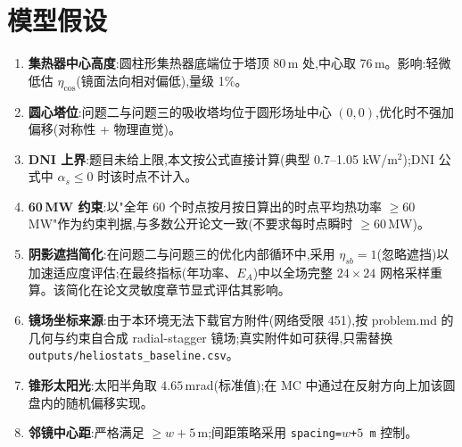 \documentclass[UTF8,a4paper,12pt]{ctexart}
\begin{document}
\section{模型假设}
\begin{enumerate}[label=\textbf{H\arabic*:}, leftmargin=2em]
  \item \textbf{集热器中心高度}:圆柱形集热器底端位于塔顶 80\,m 处,中心取 76\,m。影响:轻微低估 $\eta_{\cos}$(镜面法向相对偏低),量级 1\%。
  \item \textbf{圆心塔位}:问题二与问题三的吸收塔均位于圆形场址中心 $(0,0)$,优化时不强加偏移(对称性 + 物理直觉)。
  \item \textbf{DNI 上界}:题目未给上限,本文按公式直接计算(典型 0.7--1.05 kW/m$^2$);DNI 公式中 $\alpha_s\le 0$ 时该时点不计入。
  \item \textbf{60\,MW 约束}:以"全年 60 个时点按月按日算出的时点平均热功率 $\ge 60$\,MW"作为约束判据,与多数公开论文一致(不要求每时点瞬时 $\ge 60$\,MW)。
  \item \textbf{阴影遮挡简化}:在问题二与问题三的优化内部循环中,采用 $\eta_{sb}=1$(忽略遮挡)以加速适应度评估;在最终指标(年功率、$E_A$)中以全场完整 $24\times 24$ 网格采样重算。该简化在论文灵敏度章节显式评估其影响。
  \item \textbf{镜场坐标来源}:由于本环境无法下载官方附件(网络受限 451),按 problem.md 的几何与约束自合成 radial-stagger 镜场;真实附件如可获得,只需替换 \texttt{outputs/heliostats\_baseline.csv}。
  \item \textbf{锥形太阳光}:太阳半角取 $4.65$\,mrad(标准值);在 MC 中通过在反射方向上加该圆盘内的随机偏移实现。
  \item \textbf{邻镜中心距}:严格满足 $\ge w+5$\,m;间距策略采用 \texttt{spacing=$w$+$5$\,m} 控制。
\end{enumerate}
\end{document}
